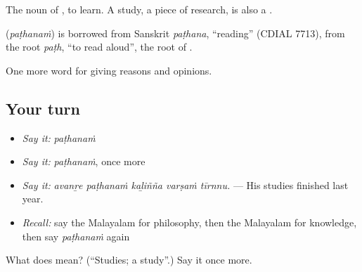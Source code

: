 The noun of , to learn. A study, a piece of research, is also a .

\begin{cousinweb}
\textbf{} (\emph{paṭhanaṁ}) is borrowed from Sanskrit \emph{paṭhana}, \textquotedblleft{}reading\textquotedblright{} (CDIAL 7713), from the root \emph{paṭh}, \textquotedblleft{}to read aloud\textquotedblright{}, the root of .
\end{cousinweb}

\begin{grammarlens}[title={What you've built}]
One more word for giving reasons and opinions.
\end{grammarlens}

\subsection*{Your turn}
\begin{itemize}
\raggedright
  \item \emph{Say it:} \emph{paṭhanaṁ}
  \item \emph{Say it:} \emph{paṭhanaṁ}, once more
  \item \emph{Say it:} \emph{avanṟe paṭhanaṁ kaḻiñña varṣaṁ tīrnnu.} — His studies finished last year.
  \item \emph{Recall:} say the Malayalam for philosophy, then the Malayalam for knowledge, then say \emph{paṭhanaṁ} again
\end{itemize}

\begin{tcolorbox}[breakable,colback=teal!4,colframe=teal!35!black,title={Before you move on}]
What does  mean? (\textquotedblleft{}Studies; a study\textquotedblright{}.) Say it once more.
\end{tcolorbox}
